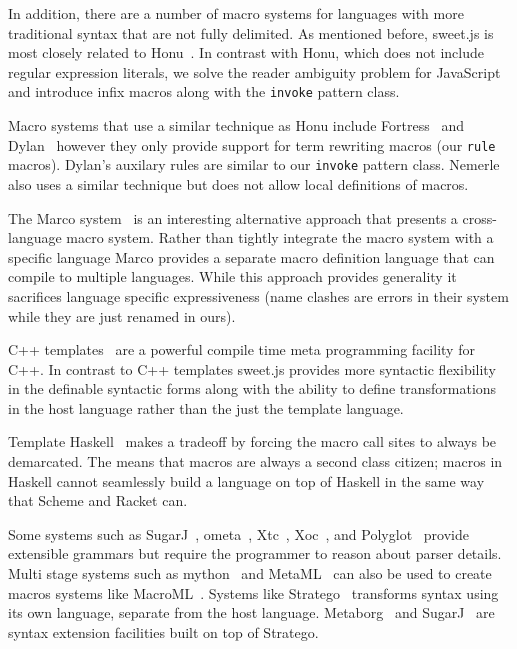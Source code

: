 \documentclass[preprint,10pt]{sigplanconf}
\begin{document}
In addition, there are a number of macro systems for languages with more traditional syntax that are not fully delimited. 
As mentioned before, sweet.js is most closely related to Honu~\cite{Rafkind2012,Rafkind2013}. In contrast with Honu, which does not include regular expression literals, we solve the reader ambiguity problem for JavaScript and introduce infix macros along with the \verb!invoke! pattern class.


Macro systems that use a similar technique as Honu include 
Fortress~\cite{Allen2009} and
Dylan~\cite{Bachrach1999} however they only provide support for term rewriting macros (our \verb!rule! macros).
Dylan's auxilary rules are similar to our \verb!invoke! pattern class.
Nemerle~\cite{Skalski2004} also uses a similar technique but does not allow local definitions of macros.

The Marco system~\cite{Lee2012a} is an interesting alternative
approach that presents a cross-language macro system. Rather than
tightly integrate the macro system with a specific language Marco
provides a separate macro definition language that can compile to
multiple languages. While this approach provides generality it
sacrifices language specific expressiveness (\eg name clashes are
errors in their system while they are just renamed in ours).

C++ templates~\cite{Alexandrescu2001} are a powerful compile time meta programming facility for C++. In contrast to C++ templates sweet.js provides more syntactic flexibility in the definable syntactic forms along with the ability to define transformations in the host language rather than the just the template language.

Template Haskell~\cite{Sheard2002} makes a tradeoff by forcing the macro call sites to always be demarcated. The means that macros are always a second class citizen; macros in Haskell cannot seamlessly build a language on top of Haskell in the same way that Scheme and Racket can.

Some systems such as 
SugarJ~\cite{Erdweg2011},
ometa~\cite{Warth2007},
Xtc~\cite{Grimm2006},
Xoc~\cite{Cox2008}, and Polyglot~\cite{Nystrom2003} provide extensible grammars but require the programmer to reason about parser details.
Multi stage systems such as mython~\cite{Riehl2009} and MetaML~\cite{Taha1997,Martel1997} can also be used to create macros systems like MacroML~\cite{Ganz2001}.
Systems like
Stratego~\cite{Visser2004} transforms syntax using its own language, separate from the host language. Metaborg~\cite{Bravenboer2004} and SugarJ~\cite{Erdweg2011} are syntax extension facilities built on top of Stratego.
\end{document}
